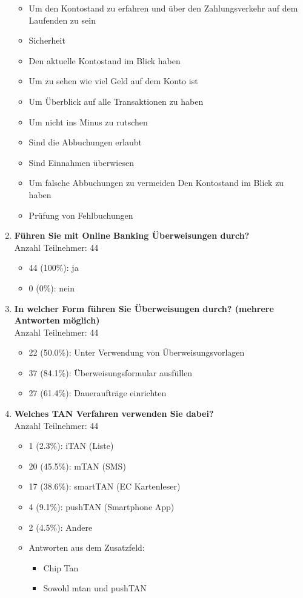 \begin{enumerate}
\begin{itemize}
        \item Um den Kontostand zu erfahren und über den Zahlungsverkehr auf dem Laufenden zu sein
        \item Sicherheit
        \item Den aktuelle Kontostand im Blick haben
        \item Um zu sehen wie viel Geld auf dem Konto ist
        \item Um Überblick auf alle Transaktionen zu haben
        \item Um nicht ins Minus zu rutschen
        \item Sind die Abbuchungen erlaubt
        \item Sind Einnahmen überwiesen
        \item Um falsche Abbuchungen zu vermeiden Den Kontostand im Blick zu haben
        \item Prüfung von Fehlbuchungen
    \end{itemize}
    
     \item \textbf{Führen Sie mit Online Banking Überweisungen durch?} \\ Anzahl Teilnehmer: 44
    \begin{itemize}
        \item[] 44 (100\%): ja
        \item[] 0 (0\%): nein
    \end{itemize}
    
     \item \textbf{In welcher Form führen Sie Überweisungen durch? (mehrere Antworten möglich)} \\ Anzahl Teilnehmer: 44
    \begin{itemize}
        \item[] 22 (50.0\%): Unter Verwendung von Überweisungsvorlagen
        \item[] 37 (84.1\%): Überweisungsformular ausfüllen
        \item[] 27 (61.4\%): Daueraufträge einrichten
    \end{itemize}
    
     \item \textbf{Welches TAN Verfahren verwenden Sie dabei?} \\ Anzahl Teilnehmer: 44
    \begin{itemize}
        \item[] 1 (2.3\%): iTAN (Liste)
        \item[] 20 (45.5\%): mTAN (SMS)
        \item[] 17 (38.6\%): smartTAN (EC Kartenleser)
        \item[] 4 (9.1\%): pushTAN (Smartphone App)
        \item[] 2 (4.5\%): Andere 
        \item[] Antworten aus dem Zusatzfeld: 
        \begin{itemize}
            \item[] Chip Tan
            \item[] Sowohl mtan und pushTAN
        \end{itemize}
    \end{itemize}
    

\end{enumerate}
